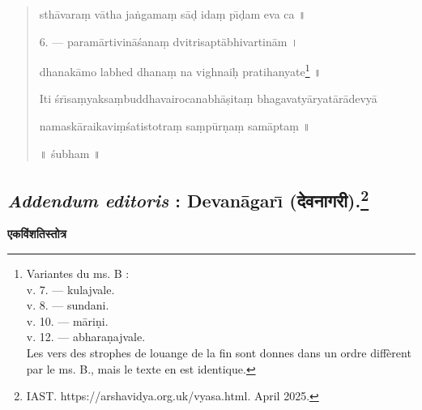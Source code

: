 \documentclass[a4paper, 11pt, oneside, french, landscape, twocolumn]{article}
\begin{document}
\begin{quotation}
sth\={a}vara\d{m} v\={a}tha ja\.{n}gama\d{m} s\={a}\d{d} ida\d{m} p\={\i}\d{d}am eva ca \texthindi{॥}

\bigskip

6. --- param\={a}rtivin\={a}\'{s}ana\d{m} dvitrisapt\={a}bhivartin\={a}m \texthindi{।}

dhanak\={a}mo labhed dhana\d{m} na vighnai\d{h} pratihanyate\footnote{Variantes du ms. B :\\\hspace*{10mm}v. 7. --- kulajvale.\\\hspace*{10mm}v. 8. --- sundani.\\\hspace*{10mm}v. 10. --- m\={a}ri\d{n}i.\\\hspace*{10mm}v. 12. --- abhara\d{n}ajvale.\\\hspace*{5mm}Les vers des strophes de louange de la fin sont donnes dans un ordre diffèrent par le ms. B., mais le texte en est identique.} \texthindi{॥}

\bigskip

Iti \'{s}r\={\i}sa\d{m}yaksa\d{m}buddhavairocanabh\={a}\d{s}ita\d{m} bhagavaty\={a}ryat\={a}r\={a}devy\={a}

namask\={a}raikavi\d{m}\'{s}atistotra\d{m} sa\d{m}p\={u}r\d{n}a\d{m} sam\={a}pta\d{m} \texthindi{॥}

\bigskip

\texthindi{॥} \'{s}ubham \texthindi{॥}
\end{quotation}
\clearpage
\subsection[\emph{Addendum editoris} : Devan\={a}gar\={\i} \texthindi{(देवनागरी)}.]{\emph{Addendum editoris} : Devan\={a}gar\={\i} \texthindi{(देवनागरी)}.\footnote{IAST. https://arshavidya.org.uk/vyasa.html. April 2025.}}
\begin{center}
\texthindi{\textbf{एकविंशतिस्तोत्र}}
\end{center}
\end{document}
